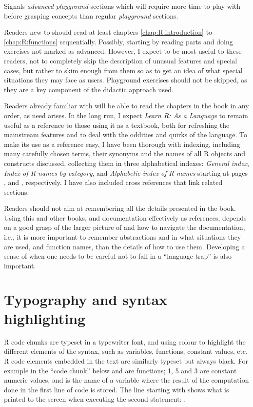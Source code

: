 \documentclass[krantz2]{krantz}\usepackage{knitr}
\begin{document}
\begin{advplayground}
Signals \emph{advanced playground} sections which will require more time to play with before grasping concepts than regular \emph{playground} sections.
\end{advplayground}

Readers new to \Rlang should read at least chapters \ref{chap:R:introduction} to \ref{chap:R:functions} sequentially. Possibly, starting by reading parts and doing exercises not marked as advanced. However, I expect to be most useful to these readers, not to completely skip the description of unusual features and special cases, but rather to skim enough from them so as to get an idea of what special situations they may face as \Rlang users. Playground exercises should not be skipped, as they are a key component of the didactic approach used.

Readers already familiar with \Rlang will be able to read the chapters in the book in any order, as need arises. In the long run, I expect \emph{Learn R: As a Language} to remain useful as a reference to those using it as a textbook, both for refreshing the mainstream features and to deal with the oddities and quirks of the language. To make its use as a reference easy, I have been thorough with indexing, including many carefully chosen terms, their synonyms and the names of all R objects and constructs discussed, collecting them in three alphabetical indexes: \emph{General index}, \emph{Index of R names by category}, and \emph{Alphabetic index of R names} starting at pages \pageref{idx:general}, \pageref{idx:rcats} and \pageref{idx:rindex}, respectively. I have also included cross references that link related sections.

Readers should not aim at remembering all the details presented in the book. Using this and other books, and documentation effectively as references, depends on a good grasp of the larger picture of \Rlang and how to navigate the documentation; i.e., it is more important to remember abstractions and in what situations they are used, and function names, than the details of how to use them. Developing a sense of when one needs to be careful not to fall in a ``language trap'' is also important.

\section*{Typography and syntax highlighting}

R code chunks are typeset in a typewriter font, and using colour to highlight the different elements of the syntax, such as variables, functions, constant values, etc. R code elements embedded in the text are similarly typeset but always black. For example in the ``code chunk'' below  and  are functions; 1, 5 and 3 are constant numeric values, and  is the name of a variable where the result of the computation done in the first line of code is stored. The line starting with \code{\#\# } shows what is printed to the screen when executing the second statement: .
\end{document}
